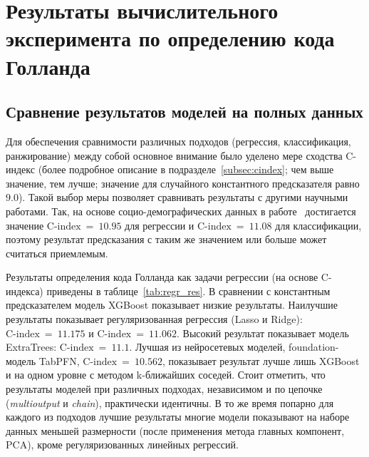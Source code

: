 
\section{Результаты вычислительного эксперимента по определению кода Голланда}

\subsection{Сравнение результатов моделей на полных данных}

Для обеспечения сравнимости различных подходов (регрессия, классификация, ранжирование) между собой основное внимание было уделено мере сходства C-индекс (более подробное описание в подразделе~\ref{subsec:cindex}; чем выше значение, тем лучше; значение для случайного константного предсказателя равно $9.0$). Такой выбор меры позволяет сравнивать результаты с другими научными работами. Так, на основе социо-демографических данных в работе~\cite{Bogacheva} достигается значение $\text{C‑index}~=~10.95$ для регрессии и $\text{C‑index}~=~11.08$ для классификации, поэтому результат предсказания с таким же значением или больше может считаться приемлемым.




Результаты определения кода Голланда как задачи регрессии (на основе C-индекса) приведены в таблице~\ref{tab:regr_res}. В сравнении с константным предсказателем модель XGBoost показывает низкие результаты. Наилучшие результаты показывает регуляризованная регрессия (Lasso и Ridge): $\text{C‑index}~=~11.175$ и $\text{C‑index}~=~11.062$. Высокий результат показывает модель ExtraTrees: $\text{C‑index}~=~11.1$. Лучшая из нейросетевых моделей, foundation-модель TabPFN, $\text{C‑index}~=~10.562$, показывает результат лучше лишь XGBoost и на одном уровне с методом k-ближайших соседей. Стоит отметить, что результаты моделей при различных подходах, независимом и по цепочке (\emph{multioutput} и \emph{chain}), практически идентичны. В то же время попарно для каждого из подходов лучшие результаты многие модели показывают на наборе данных меньшей размерности (после применения метода главных компонент, PCA), кроме регуляризованных линейных регрессий. 

% 


